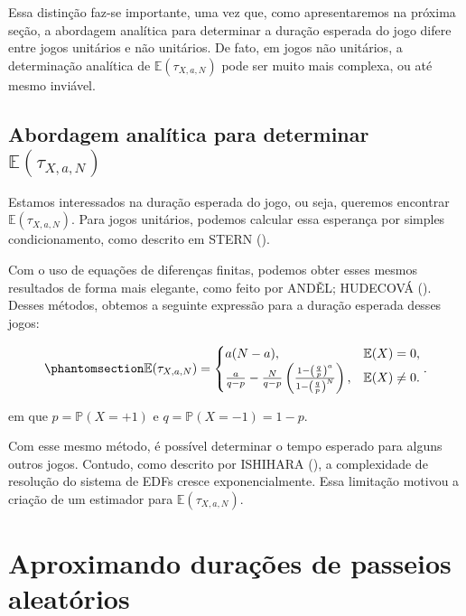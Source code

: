 \documentclass[
  brazilian,
  12pt,
]{article}
\theoremstyle{definition}
\theoremstyle{definition}
\theoremstyle{remark}
\begin{document}
Essa distinção faz-se importante, uma vez que, como apresentaremos na
próxima seção, a abordagem analítica para determinar a duração esperada
do jogo difere entre jogos unitários e não unitários. De fato, em jogos
não unitários, a determinação analítica de
\(\mathbb{E}(\tau_{X, a, N})\) pode ser muito mais complexa, ou até
mesmo inviável.

\subsection{\texorpdfstring{Abordagem analítica para determinar
\(\mathbb{E}(\tau_{X, a, N})\)}{Abordagem analítica para determinar \textbackslash mathbb\{E\}(\textbackslash tau\_\{X, a, N\})}}\label{sec-anali}

Estamos interessados na duração esperada do jogo, ou seja, queremos
encontrar \(\mathbb{E}(\tau_{X, a, N})\). Para jogos unitários, podemos
calcular essa esperança por simples condicionamento, como descrito em
STERN ().

Com o uso de equações de diferenças finitas, podemos obter esses mesmos
resultados de forma mais elegante, como feito por ANDĚL; HUDECOVÁ
(). Desses métodos, obtemos a
seguinte expressão para a duração esperada desses jogos:

\begin{equation}\protect\phantomsection\label{eq-tempoteorico}{
\mathbb{E}(\tau_{X, a, N}) = \begin{cases}
a(N - a), & \mathbb{E}(X) = 0, \\
\frac{a}{q-p}-\frac{N}{q-p} \left( \frac{1- \left( \frac{q}{p} \right)^a}
        {1- \left( \frac{q}{p} \right)^N}\right), & \mathbb{E}(X) \neq 0.
\end{cases}.
}\end{equation}

em que \(p = \mathbb{P}(X = +1)\) e \(q = \mathbb{P}(X = -1) = 1 - p\).

Com esse mesmo método, é possível determinar o tempo esperado para
alguns outros jogos. Contudo, como descrito por ISHIHARA
(), a complexidade de resolução do
sistema de EDFs cresce exponencialmente. Essa limitação motivou a
criação de um estimador para \(\mathbb{E}(\tau_{X, a, N})\).

\section{Aproximando durações de passeios
aleatórios}\label{aproximando-durauxe7uxf5es-de-passeios-aleatuxf3rios}
\end{document}
